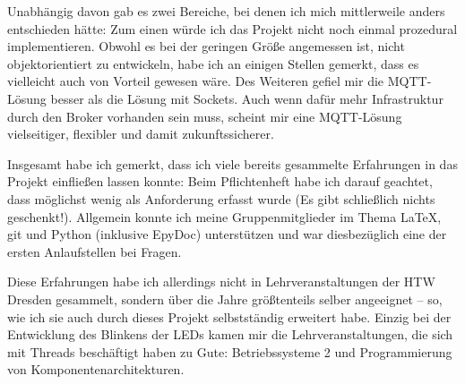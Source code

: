 Unabhängig davon gab es zwei Bereiche, bei denen ich mich mittlerweile anders entschieden hätte: Zum einen würde ich das Projekt nicht noch einmal prozedural implementieren. Obwohl es bei der geringen Größe angemessen ist, nicht objektorientiert zu entwickeln, habe ich an einigen Stellen gemerkt, dass es vielleicht auch von Vorteil gewesen wäre. Des Weiteren gefiel mir die MQTT-Lösung besser als die Lösung mit Sockets. Auch wenn dafür mehr Infrastruktur durch den Broker vorhanden sein muss, scheint mir eine MQTT-Lösung vielseitiger, flexibler und damit zukunftssicherer.

Insgesamt habe ich gemerkt, dass ich viele bereits gesammelte Erfahrungen in das Projekt einfließen lassen konnte: Beim Pflichtenheft habe ich darauf geachtet, dass möglichst wenig als Anforderung erfasst wurde (Es gibt schließlich nichts geschenkt!). Allgemein konnte ich meine Gruppenmitglieder im Thema LaTeX, git und Python (inklusive EpyDoc) unterstützen und war diesbezüglich eine der ersten Anlaufstellen bei Fragen.

Diese Erfahrungen habe ich allerdings nicht in Lehrveranstaltungen der HTW Dresden gesammelt, sondern über die Jahre größtenteils selber angeeignet -- so, wie ich sie auch durch dieses Projekt selbstständig erweitert habe. Einzig bei der Entwicklung des Blinkens der LEDs kamen mir die Lehrveranstaltungen, die sich mit Threads beschäftigt haben zu Gute: Betriebssysteme 2 und Programmierung von Komponentenarchitekturen.

